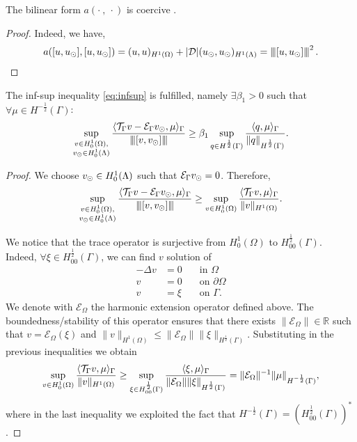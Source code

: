 \begin{lemma}\label{lemma:prob1_coercivity}
The bilinear form $a(\cdot \ , \ \cdot)$ is coercive .
\end{lemma}
\begin{proof}
 Indeed, we have,
\begin{equation*}
a([u,\ud], [u,\ud])= (u,u)_{H^1(\Omega)} + |{\cal D}|(\ud,\ud)_{H^1(\Lambda)} = \vertiii{[u,\ud]}^2\,.
\end{equation*}
\end{proof}
\begin{lemma}
The inf-sup inequality \eqref{eq:infsup} is fulfilled, namely $\exists \beta_1 >0$ such that $\forall \mu \in H^{-\frac 12}(\Gamma)$:
\begin{equation*}
\sup _{\substack{v\in H^1_0(\Omega),\\ v_{\odot} \in H^1_0(\Lambda)}} \frac{ \langle {\mathcal{T}_\Gamma} v  - \mathcal{E}_\Gamma v_{\odot}, \mu \rangle_\Gamma}{{\left\vert\kern-0.25ex\left\vert\kern-0.25ex\left\vert [v, v_{\odot}] \right\vert\kern-0.25ex\right\vert\kern-0.25ex\right\vert}}
\geq \beta_1 \sup_{q\in H^{\frac 12}(\Gamma)}\frac{\langle q, \mu\rangle_{\Gamma}}{\|q\|_{H^{\frac 12}(\Gamma)}}.
\end{equation*}
\end{lemma} 
\begin{proof}
We choose $v_{\odot} \in H^1_0(\Lambda)$ such that $\mathcal{E}_\Gamma v_{\odot} =0$. Therefore,
\begin{equation*}
\sup _{\substack{v\in H^1_0(\Omega),\\ v_{\odot} \in H^1_0(\Lambda)}} \frac{ \langle {\mathcal{T}_\Gamma} v  - \mathcal{E}_\Gamma v_{\odot}, \mu\rangle_\Gamma}{{\left\vert\kern-0.25ex\left\vert\kern-0.25ex\left\vert [v, v_{\odot}] \right\vert\kern-0.25ex\right\vert\kern-0.25ex\right\vert}} 
\geq \sup _{v\in H^1_0(\Omega)} \frac{ \langle {\mathcal{T}_\Gamma} v, \mu \rangle_\Gamma}{\|v\|_{H^1(\Omega)}}.
\end{equation*}

We notice that the trace operator is surjective from $H^1_0(\Omega)$ to $H^{\frac12}_{00}(\Gamma)$. Indeed, $\forall \xi \in H^{\frac 12}_{00}(\Gamma)$, we  can find $v$ solution of
\begin{eqnarray*}
-\Delta v&=0 \quad &\text{in }\Omega\\
v&=0 &\text{on }\partial \Omega\\
v&=\xi &\text{on } \Gamma. 
\end{eqnarray*}
We denote with $\mathcal{E}_\Omega$ the harmonic extension operator defined above.
The boundedness/stability of this operator ensures that there exists $\| \mathcal{E}_\Omega \| \in \mathbb{R}$ such that
$v=\mathcal{E}_\Omega(\xi) $ and $\|v \|_{H^1(\Omega)}\leq \|\mathcal{E}_\Omega\| \|\xi \|_{H^{\frac 12}(\Gamma)}$. 
Substituting in the previous inequalities we obtain
\begin{equation}\label{infsup_traceop}
\sup _{v\in H^1_0(\Omega)} \frac{ \langle \trace v, \mu \rangle_\Gamma}{\|v\|_{H^1(\Omega)}}
\geq  \sup _{\xi \in H^{\frac 12}_{00}(\Gamma )} \frac{ \langle \xi , \mu \rangle_\Gamma}{\|\mathcal{E}_\Omega\| \|\xi\|_{H^{\frac 12}(\Gamma)}}
= \|\mathcal{E}_\Omega\|^{-1} \|\mu\|_{H^{-\frac 12}(\Gamma)},
\end{equation}
where in the last inequality we exploited the fact that $H^{-\frac 12}(\Gamma)=(H^{\frac 12 }_{00}(\Gamma))^*$. 
\end{proof}


